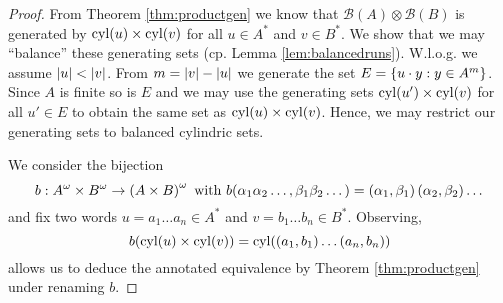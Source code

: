 \begin{proof}
  From Theorem \ref{thm:productgen} we know that 
  $\mathcal{B}(A)\otimes\mathcal{B}(B)$ is generated by $\operatorname{cyl}(u)\times\operatorname{cyl}(v)$ 
  for all $u\in A^{*}$ and $v\in B^{*}$. We show that we may 
  \enquote{balance} these generating sets (cp. Lemma \ref{lem:balancedruns}). 
  W.l.o.g. we assume $\left\vert{u}\right\vert < \left\vert{v}\right\vert$. From $m = \left\vert{v}\right\vert - \left\vert{u}\right\vert$ we 
  generate the set $E = \left\{u\cdot y:y\in A^{m}\right\}$. Since $A$ is finite so is 
  $E$ and we may use the generating sets $\operatorname{cyl}(u')\times\operatorname{cyl}(v)$ for all 
  $u'\in E$ to obtain the same set as $\operatorname{cyl}(u)\times\operatorname{cyl}(v)$. Hence, we may 
  restrict our generating sets to balanced cylindric sets. 

  We consider the bijection
  \begin{equation*}
    b:A^{\omega}\times B^{\omega}\rightarrow\left(A\times B\right)^{\omega}
    \text{ with }b(\alpha_{1}\alpha_{2}\dots, \beta_{1}\beta_{2}\dots) = 
      \left(\alpha_{1}, \beta_{1}\right)\left(\alpha_{2}, \beta_{2}\right)\dots
  \end{equation*}
  and fix two words $u = a_{1}\dots a_{n}\in A^{*}$ and 
  $v = b_{1}\dots b_{n}\in B^{*}$. Observing, 
  \begin{equation*}
    b(\operatorname{cyl}(u)\times\operatorname{cyl}(v)) = \operatorname{cyl}(\left(a_{1}, b_{1}\right)\dots
      \left(a_{n}, b_{n}\right))
  \end{equation*} 
  allows us to deduce the annotated equivalence by Theorem \ref{thm:productgen} 
  under renaming $b$.
\end{proof}

